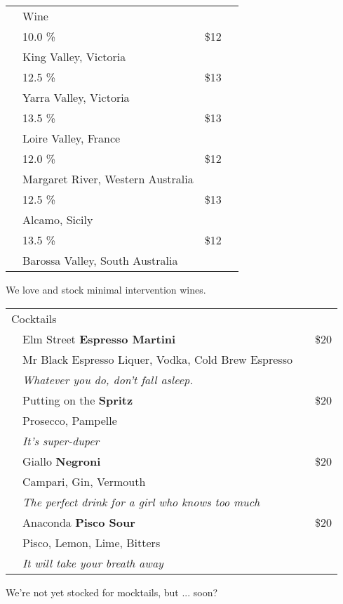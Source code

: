 \documentclass[12pt]{article}
\makeatletter
\newcommand*\ColText[1]{\textcolor{SpringGreen4}{#1}}
\newcommand*\GroupTitle[1]{%
   \multicolumn{2}{l}{\fontsize{20}{29}\selectfont\ColText{#1}}\\[0.8em]}
\newcommand*\GroupGlassTitle[2]{%
  \noalign{\vspace{2em}}
  \fontfamily{qzc}\selectfont #2 & \vspace{1em}\fontsize{20}{29}\selectfont\ColText{#1}}
\newenvironment{Group}
  {\vspace{2em}\noindent\begin{tabular*}{\textwidth}{@{} p{10mm} l@{\extracolsep{\fill}} r@{\hspace{1em}} r@{}}} %
  {\end{tabular*}}
\newcommand*\Cocktail[3]{%
  \noalign{\vspace{2em}}
  \vspace{0.5mm} %
  \fontfamily{qzc}\selectfont #2 & #1 \tiny\dotfill & \tiny\dotfill & \normalsize \$#3}
\newcommand*\Booze[3]{%
  \noalign{\vspace{1em}}
  \multicolumn{2}{l}{ #1 \tiny\dotfill } & \scriptsize #2 \% \tiny\dotfill & \normalsize \$#3}
\newcommand*\Expl[1]{%
  {} & \hspace*{0.1em} \scriptsize #1}
\newcommand*\Glass[2]{%
    \begin{tikzpicture}[remember picture,overlay]
        \node[xshift=5mm,yshift=0mm]{%
            \texttt{[image: Glasses/\#1.png]}
        };
    \end{tikzpicture}%
}
\newcommand*\GlassFlute{%
    \Glass{flute}{3mm}}
\newcommand*\GlassMartini{%
    \Glass{martini}{7mm}}
\newcommand*\GlassOldFashioned{%
    \Glass{old_fashioned}{6mm}}
\newcommand*\GlassWine{%
    \Glass{wine}{4.5mm}}
\makeatother
\begin{document}
\begin{Group}
    \GroupGlassTitle{Wine}{\GlassWine} \\
    \Booze{Puncheon Darts \bf Prosseco }{10.0}{12} \\
	\Expl{King Valley, Victoria} \\
    \Booze{Lighthand \bf Chardonnay}{12.5}{13} \\
	\Expl{Yarra Valley, Victoria} \\
    \Booze{Domain Guy Allion \bf Sauvignon Blanc}{13.5}{13} \\
	\Expl{Loire Valley, France} \\
    \Booze{Continental Platter \bf Rosé}{12.0}{12} \\
	\Expl{Margaret River, Western Australia} \\
    \Booze{Ciello Rossa \bf Nero d'Avalo}{12.5}{13} \\
	\Expl{Alcamo, Sicily} \\
    \Booze{Continental Platter \bf Shiraz}{13.5}{12} \\
	\Expl{Barossa Valley, South Australia} \\
\end{Group}
\vfill
\begin{center}
	We love and stock minimal intervention wines.
\end{center}

\begin{Group}
    \GroupTitle{Cocktails}
    \Cocktail{Elm Street \bf Espresso Martini}{\GlassMartini}{20} \\
        \Expl{Mr Black Espresso Liquer, Vodka, Cold Brew Espresso} \\
	\Expl{\it Whatever you do, don't fall asleep.} \\
    \Cocktail{Putting on the \bf Spritz}{\GlassFlute}{20} \\
        \Expl{Prosecco, Pampelle} \\
        \Expl{\it It's super-duper} \\
    \Cocktail{Giallo \bf Negroni}{\GlassOldFashioned}{20} \\
        \Expl{Campari, Gin, Vermouth} \\
        \Expl{\it The perfect drink for a girl who knows too much} \\
    \Cocktail{Anaconda \bf Pisco Sour}{\GlassOldFashioned}{20} \\
        \Expl{Pisco, Lemon, Lime, Bitters} \\
        \Expl{\it It will take your breath away} \\
\end{Group}
\vfill
\begin{center}
	We're not yet stocked for mocktails, but ... soon?
\end{center}
\end{document}
